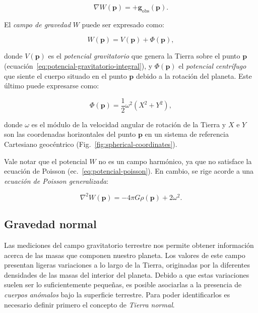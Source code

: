 \begin{equation}
    \nabla W(\mathbf{p}) = +\mathbf{g}_\text{obs}(\mathbf{p}).
\end{equation}

El \emph{campo de gravedad} $W$ puede ser expresado como:

\begin{equation}
    W(\mathbf{p}) = V(\mathbf{p}) + \Phi(\mathbf{p}),
\end{equation}

\noindent donde $V(\mathbf{p})$ es el \emph{potencial gravitatorio} que genera
la Tierra sobre el punto $\mathbf{p}$
(ecuación~\ref{eq:potencial-gravitatorio-integral}), y $\Phi(\mathbf{p})$ el
\emph{potencial centrífugo} que siente el cuerpo situado en el punto
$\mathbf{p}$ debido a la rotación del planeta.
Este último puede expresarse como:

\begin{equation}
    \Phi(\mathbf{p}) = \frac{1}{2} \omega^2 (X^2 + Y^2),
    \label{eq:potencial-centrifugo}
\end{equation}

\noindent donde $\omega$ es el módulo de la velocidad angular de rotación de la
Tierra y $X$ e $Y$ son las coordenadas horizontales del punto $\mathbf{p}$ en
un sistema de referencia Cartesiano geocéntrico
(Fig.~\ref{fig:spherical-coordinates}).

Vale notar que el potencial $W$ no es un campo harmónico, ya que no satisface
la ecuación de Poisson (ec.~\ref{eq:potencial-poisson}). En cambio, se rige
acorde a una \emph{ecuación de Poisson generalizada}:

\begin{equation}
    \nabla^2 W(\mathbf{p}) = - 4\pi G \rho(\mathbf{p}) + 2 \omega^2.
\end{equation}

\subsection{Gravedad normal}

Las mediciones del campo gravitatorio terrestre nos permite obtener información
acerca de las masas que componen nuestro planeta. Los valores de este campo
presentan ligeras variaciones a lo largo de la Tierra, originadas por la
diferentes densidades de las masas del interior del planeta. Debido a que estas
variaciones suelen ser lo suficientemente pequeñas, es posible asociarlas a la
presencia de \emph{cuerpos anómalos} bajo la superficie terrestre. Para poder
identificarlos es necesario definir primero el concepto de \emph{Tierra
normal}.

